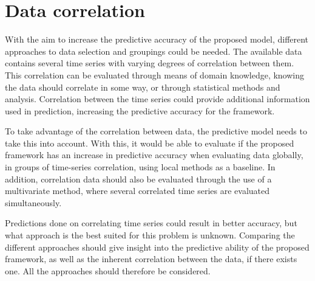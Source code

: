 \section{Data correlation}
\label{section:Architecture:ModelStructure}

With the aim to increase the predictive accuracy of the proposed model,
different approaches to data selection and groupings could be needed.
The available data contains several time series with varying degrees of correlation between them.
This correlation can be evaluated through means of domain knowledge,
knowing the data should correlate in some way, or through statistical methods and analysis.
Correlation between the time series could provide additional information used in prediction,
increasing the predictive accuracy for the framework.


To take advantage of the correlation between data,
the predictive model needs to take this into account.
With this, it would be able to evaluate if the proposed framework has an increase in predictive accuracy
when evaluating data globally, in groups of time-series correlation, using local methods as a baseline.
In addition, correlation data should also be evaluated through the use of a multivariate method,
where several correlated time series are evaluated simultaneously.


Predictions done on correlating time series could result in better accuracy,
but what approach is the best suited for this problem is unknown.
Comparing the different approaches should give insight into the predictive ability of the proposed framework,
as well as the inherent correlation between the data, if there exists one.
All the approaches should therefore be considered.

